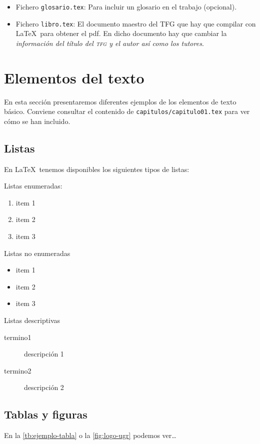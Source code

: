 \begin{itemize}
  \item Fichero \texttt{glosario.tex}: Para incluir un glosario en el trabajo (opcional).

   \item Fichero \texttt{libro.tex}: El documento maestro del TFG que hay que compilar con \LaTeX\ para obtener el pdf. En dicho documento hay que cambiar la \emph{información del título del \textsc{tfg} y el autor así como los tutores}.
\end{itemize}


\section{Elementos del texto}

En esta sección presentaremos diferentes ejemplos de los elementos de texto básico. Conviene consultar el contenido de \texttt{capitulos/capitulo01.tex} para ver cómo se han incluido.

\subsection{Listas}
En \LaTeX\ tenemos disponibles los siguientes tipos de listas:

Listas enumeradas:
\begin{enumerate}
  \item item 1
  \item item 2
  \item item 3
\end{enumerate}

Listas no enumeradas
\begin{itemize}
  \item item 1
  \item item 2
  \item item 3
  \end{itemize}

Listas descriptivas
\begin{description}
  \item[termino1] descripción 1
  \item[termino2] descripción 2
\end{description}

\subsection{Tablas y figuras}

En la \autoref{tb:ejemplo-tabla} o la \autoref{fig:logo-ugr} podemos ver\ldots


